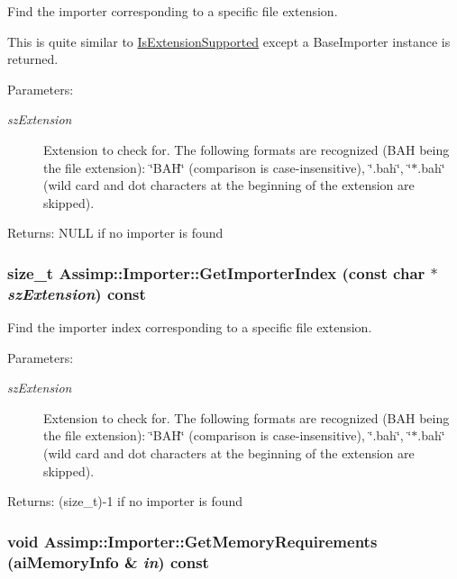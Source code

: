 Find the importer corresponding to a specific file extension.

This is quite similar to \hyperlink{class_assimp_1_1_importer_9146ea75c33c0aac0310195346877388}{IsExtensionSupported} except a BaseImporter instance is returned. \begin{Desc}
\item[Parameters:]
\begin{description}
\item[{\em szExtension}]Extension to check for. The following formats are recognized (BAH being the file extension): \char`\"{}BAH\char`\"{} (comparison is case-insensitive), \char`\"{}.bah\char`\"{}, \char`\"{}$\ast$.bah\char`\"{} (wild card and dot characters at the beginning of the extension are skipped). \end{description}
\end{Desc}
\begin{Desc}
\item[Returns:]NULL if no importer is found \end{Desc}
\hypertarget{class_assimp_1_1_importer_ee103460f66b9cbe3143400ec92ffc56}{
\subsubsection[GetImporterIndex]{\setlength{\rightskip}{0pt plus 5cm}size\_\-t Assimp::Importer::GetImporterIndex (const char $\ast$ {\em szExtension}) const}}
\label{class_assimp_1_1_importer_ee103460f66b9cbe3143400ec92ffc56}


Find the importer index corresponding to a specific file extension.

\begin{Desc}
\item[Parameters:]
\begin{description}
\item[{\em szExtension}]Extension to check for. The following formats are recognized (BAH being the file extension): \char`\"{}BAH\char`\"{} (comparison is case-insensitive), \char`\"{}.bah\char`\"{}, \char`\"{}$\ast$.bah\char`\"{} (wild card and dot characters at the beginning of the extension are skipped). \end{description}
\end{Desc}
\begin{Desc}
\item[Returns:](size\_\-t)-1 if no importer is found \end{Desc}
\hypertarget{class_assimp_1_1_importer_ba2eacd0b627cb481b6d66d9ca55eac9}{
\subsubsection[GetMemoryRequirements]{\setlength{\rightskip}{0pt plus 5cm}void Assimp::Importer::GetMemoryRequirements ({\bf aiMemoryInfo} \& {\em in}) const}}
\label{class_assimp_1_1_importer_ba2eacd0b627cb481b6d66d9ca55eac9}


